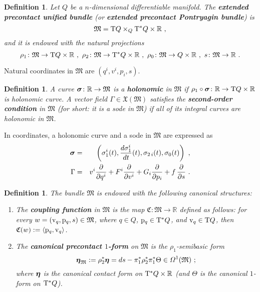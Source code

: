 \documentclass[12pt]{report}
\newtheorem{definition}[teor]{Definition}
\def\beann{\begin{eqnarray*}}
\def\eeann{\end{eqnarray*}}
\def\ben{\begin{enumerate}}
\def\een{\end{enumerate}}
\def\vf{\mathfrak X}
\def\df{{\mit\Omega}}
\def\Real{\mathbb{R}}
\def\bmeta{\mbox{\boldmath $\eta$}}
\def\Tan{{\rm T}}
\begin{document}
\begin{definition}
Let $Q$ be a $n$-dimensional differentiable manifold.
The {\sl \textbf{extended precontact unified bundle}}
(or {\sl \textbf{extended precontact Pontryagin bundle}}) is
$$
\mathfrak{M}=\Tan Q\times_Q\Tan^*Q\times\Real \ ,
$$
and it is endowed with the natural projections
$$
\rho_1\colon\mathfrak{M}\to\Tan Q\times\Real \ ,\
\rho_2\colon\mathfrak{M}\to\Tan^*Q\times\Real \ ,\
\rho_0\colon\mathfrak{M}\to Q\times\Real \ ,\ 
s\colon\mathfrak{M}\to \Real \ .
\label{project}
$$
\end{definition}

Natural coordinates in $\mathfrak{M}$ are $(q^i,v^i,p_i,s)$.

\begin{definition}
A curve $\mbox{\boldmath $\sigma$}\colon\Real\rightarrow\mathfrak{M}$
is a \textbf{holonomic} in $\mathfrak{M}$ if
$\rho_1\circ\mbox{\boldmath $\sigma$}\colon\Real\to\Tan Q\times\Real$ is holonomic curve.
A vector field $\Gamma\in\vf(\mathfrak{M})$ 
satisfies the \textbf{second-order condition} in $\mathfrak{M}$
(for short: it is a {\sc sode} in $\mathfrak{M}$) if all of its integral curves 
are holonomic in $\mathfrak{M}$. 
\end{definition}

In coordinates, a holonomic curve and a {\sc sode} in $\mathfrak{M}$ are expressed as 
\beann
\mbox{\boldmath $\sigma$}&=&
\left(\sigma_1^i(t),\frac{d\sigma_1^i}{d t}(t),\sigma_{2\,i}(t),\sigma_0(t) \right) \ ,
\\
\Gamma&=&v^i \frac{\partial}{\partial q^i}+F^i \frac{\partial}{\partial v^i}+G_i \frac{\partial}{\partial p_i}+f\,\frac{\partial}{\partial s} \ .
\eeann

\begin{definition}
The bundle $\mathfrak{M}$ is endowed with the following canonical structures:
\ben
\item
The \textbf{coupling function} in $\mathfrak{M}$ is the
map $\mathfrak{C}\colon\mathfrak{M}\to\Real$  defined as follows: for every
$w=({\rm v}_q,{\rm p}_q,s)\in\mathfrak{M}$, where $q\in Q$,
${\rm p}_q\in\Tan^*Q$, and ${\rm v}_q\in\Tan Q$, then
$\mathfrak{C}(w):=\langle{\rm p}_q,{\rm v}_q\rangle$.
\item
The \textbf{canonical precontact $1$-form} on $\mathfrak{M}$
is the $\rho_1$-semibasic form
$$\bmeta_{\mathfrak{M}}:=\rho_2^*\bmeta=
d s-\pi_1^*\rho_2^*\pi_1^*\Theta\in\df^1(\mathfrak{M})\ ;$$
where $\bmeta$ is the canonical contact form on $\Tan^*Q\times\Real$
(and $\Theta$ is the canonical $1$-form on
$\Tan^*Q$).
\een
\label{coupling}
\end{definition}
\end{document}
